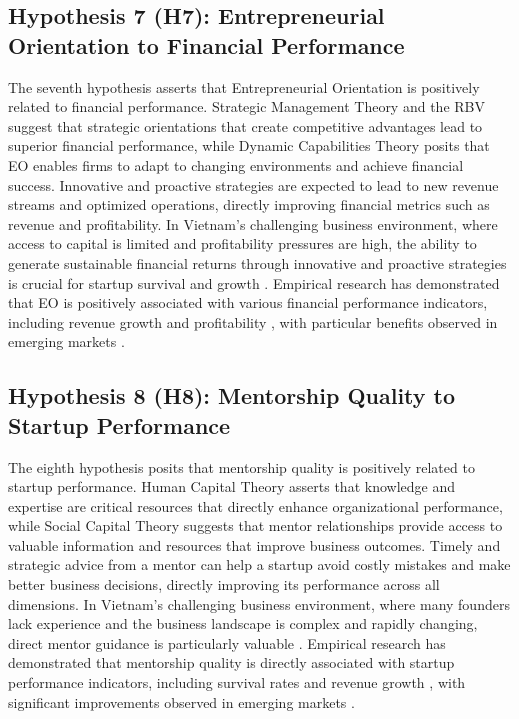 \documentclass[../Main.tex]{subfiles}
\begin{document}
    \subsection{Hypothesis 7 (H7): Entrepreneurial Orientation to Financial Performance}
    The seventh hypothesis asserts that Entrepreneurial Orientation is positively related to financial performance. Strategic Management Theory \autocite{porter1980competitive} and the RBV \autocite{barney1991firm} suggest that strategic orientations that create competitive advantages lead to superior financial performance, while Dynamic Capabilities Theory \autocite{teece1997dynamic} posits that EO enables firms to adapt to changing environments and achieve financial success. Innovative and proactive strategies are expected to lead to new revenue streams and optimized operations, directly improving financial metrics such as revenue and profitability. In Vietnam's challenging business environment, where access to capital is limited and profitability pressures are high, the ability to generate sustainable financial returns through innovative and proactive strategies is crucial for startup survival and growth \autocite{vietnam_innovation_report_2024}. Empirical research has demonstrated that EO is positively associated with various financial performance indicators, including revenue growth and profitability \autocite{rauch2009entrepreneurial, saeed2014entrepreneurial}, with particular benefits observed in emerging markets \autocite{wales2013entrepreneurial}.

    \subsection{Hypothesis 8 (H8): Mentorship Quality to Startup Performance}
    The eighth hypothesis posits that mentorship quality is positively related to startup performance. Human Capital Theory \autocite{becker1964human} asserts that knowledge and expertise are critical resources that directly enhance organizational performance, while Social Capital Theory \autocite{coleman1988social} suggests that mentor relationships provide access to valuable information and resources that improve business outcomes. Timely and strategic advice from a mentor can help a startup avoid costly mistakes and make better business decisions, directly improving its performance across all dimensions. In Vietnam's challenging business environment, where many founders lack experience and the business landscape is complex and rapidly changing, direct mentor guidance is particularly valuable \autocite{dinh2017promoting}. Empirical research has demonstrated that mentorship quality is directly associated with startup performance indicators, including survival rates and revenue growth \autocite{stjean2012mentoring}, with significant improvements observed in emerging markets \autocite{sullivan2011effectiveness}.
\end{document}
